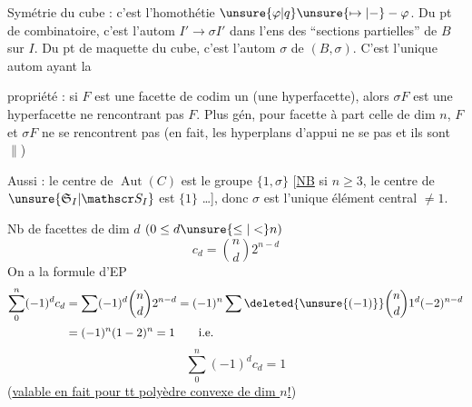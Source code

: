 Symétrie du cube : c'est l'homothétie $\unsure{\varphi|q}\unsure{\mapsto|-}-\varphi$. Du pt de  combinatoire, c'est l'autom $I'\to\sigma I'$ dans l'ens des ``sections partielles'' de $B$ sur $I$. Du pt de  maquette du cube, c'est l'autom $\sigma$ de $(B,\sigma)$. C'est l'unique autom  ayant la


propriété : si $F$ est une facette de codim un (une hyperfacette), alors $\sigma F$ est une hyperfacette ne  rencontrant pas $F$. Plus gén, pour   facette   à part celle de dim $n$, $F$ et $\sigma F$ ne se rencontrent pas (en fait, les hyperplans d'appui ne se  pas et ils sont $\parallel$)

Aussi : le centre de $\operatorname{Aut}(C)$ est le groupe $\{1,\sigma\}$ [\uline{NB} si $n\geq3$, le centre de $\unsure{\mathfrak S_I|\mathscr S_I}$ est $\{1\}$ \ldots], donc $\sigma$ est l'unique élément central $\ne1$.

Nb de facettes de dim $d$ $(0\leq d\unsure{\leq|<}n)$
\[
c_d=\binom nd2^{n-d}
\]
On a la formule d'EP
\[
\begin{aligned}
\sum_0^n(-1)^d c_d&=\sum(-1)^d\binom nd2^{n-d}=(-1)^n\sum\deleted{\unsure{(-1)}}\binom nd1^d(-2)^{n-d}\\
&=(-1)^n(1-2)^n=1\qquad\text{i.e.}
\end{aligned}
\]
\[
\boxed{\sum_0^n(-1)^d c_d=1}
\]
(\uline{valable en fait pour tt polyèdre convexe de dim $n$!})

